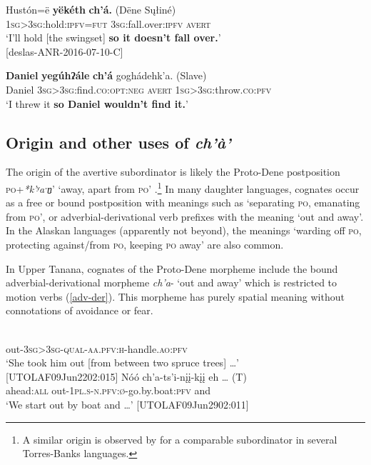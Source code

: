 \documentclass[output=paper,colorlinks,citecolor=brown
]{langscibook}
\begin{document}
\ea \label{denesuline}
\gll Hustón=ë \textbf{yëkéth} \textbf{ch'á.}  \textnormal{(Dëne Sųłiné)}\\
\textsc{1sg>3sg}:hold:\textsc{ipfv=fut} \textsc{3sg}:fall.over:\textsc{ipfv} \textsc{avert} \\
\glt `I'll hold [the swingset] \textbf{so it doesn't fall over.}' \\ \hfill [deslas-ANR-2016-07-10-C] 
\z

\ea \label{slave}
\gll   \textbf{Daniel} \textbf{yegúhʔále} \textbf{ch'á} goghádehk'a. \textnormal{(Slave)} \\
Daniel \textsc{3sg>3sg}:find.\textsc{co:opt:neg} \textsc{avert} \textsc{1sg>3sg}:throw.\textsc{co:pfv} \\
\glt `I threw it \textbf{so Daniel wouldn't find it.}' \hfill \citep[1262]{RiceK1989} 
\z


\subsection{Origin and other uses of \textit{ch'à'}}
\label{subsection:avertive-origin}
\largerpage


The origin of the avertive subordinator is likely the Proto-Dene postposition \textsc{po}+\textit{*k'ʸaˑn̠}' `away, apart from \textsc{po}' \citep{LeerJ1996CA}.\footnote{A similar origin is observed by \citet{chapters/francois} for a comparable subordinator in several Torres-Banks languages.} In many daughter languages, cognates occur as a free or bound postposition with meanings such as `separating \textsc{po}, emanating from \textsc{po}', or adverbial-derivational verb prefixes with the meaning `out and away'. In the Alaskan languages (apparently not beyond), the meanings `warding off \textsc{po}, protecting against/from \textsc{po}, keeping \textsc{po} away' are also common.

In Upper Tanana, cognates of the Proto-Dene morpheme include the bound adverbial-derivational morpheme \textit{ch'a}- `out and away' which is restricted to motion verbs (\ref{adv-der}). This morpheme has purely spatial meaning without connotations of avoidance or fear.

\begin{exe}
\ex\label{adv-der}
\begin{xlista}
\ex 
{} \\
out-\textsc{3sg>3sg-qual-aa.pfv:h}-handle.\textsc{ao:pfv} \\
\glt `She took him out [from between two spruce trees] \ldots' \\ \hfill [UTOLAF09Jun2202:015]
\ex
\gll Nóó ch'a-ts'i-nįį-kįį eh {\ldots} \textnormal{(T)}\\
ahead:\textsc{all} out-\textsc{1pl.s-n.pfv:ø}-go.by.boat:\textsc{pfv} and\\
\glt `We start out by boat and \ldots' \hfill [UTOLAF09Jun2902:011]
\end{xlista}
\end{exe}
\end{document}
